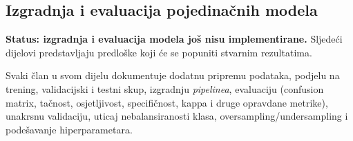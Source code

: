 \subsection{Izgradnja i evaluacija pojedinačnih modela}\label{sec:modeli}
\textbf{Status: izgradnja i evaluacija modela još nisu implementirane.}
Sljedeći dijelovi predstavljaju predloške koji će se popuniti stvarnim rezultatima.

Svaki član u svom dijelu dokumentuje dodatnu pripremu podataka, podjelu na
trening, validacijski i testni skup, izgradnju \emph{pipelinea}, evaluaciju
(confusion matrix, tačnost, osjetljivost, specifičnost, kappa i druge opravdane
metrike), unakrsnu validaciju, uticaj nebalansiranosti klasa,
oversampling/undersampling i podešavanje hiperparametara.






